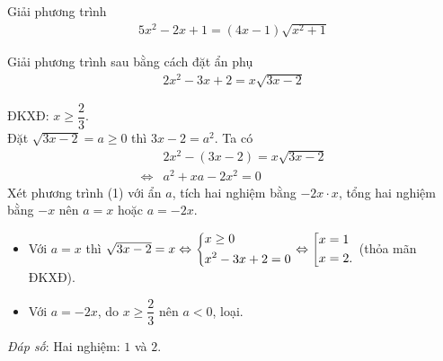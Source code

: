        
\begin{vd}
Giải phương trình
\begin{align*}
5x^2-2x+1=\left(4x-1\right)\sqrt{x^2+1} \tag{1}
\end{align*}
\end{vd}
\begin{vd}
Giải phương trình sau bằng cách đặt ẩn phụ
 \begin{align*}
2x^2-3x+2=x\sqrt{3x-2}
\end{align*}
\loigiai
{
	ĐKXĐ: $x\ge \dfrac{2}{3}$. \\ 
	Đặt $\sqrt{3x-2}=a\ge 0$ thì $3x-2=a^2$. Ta có
\begin{align*}
&2x^2-\left(3x-2\right)=x\sqrt{3x-2}\\
\Leftrightarrow &a^2+xa-2x^2=0 \tag{1}
\end{align*}
Xét phương trình (1) với ẩn $a$, tích hai nghiệm bằng $-2x \cdot x$, tổng hai nghiệm bằng $-x$ nên $a=x$ hoặc $a=-2x$.
\begin{itemize}
	\item Với $a=x$ thì $\sqrt{3x-2}=x\Leftrightarrow \left\{\begin{aligned}&x\ge 0\\&x^2-3x+2=0\end{aligned}\right.\Leftrightarrow \left[\begin{aligned}&x=1\\&x=2.\end{aligned}\right.$ (thỏa mãn ĐKXĐ).
	\item Với $a=-2x$, do $x\ge \dfrac{2}{3}$ nên $a<0$, loại.
\end{itemize}
\textit{Đáp số}: Hai nghiệm: $1$ và $2$.
}
\end{vd}
